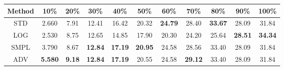 \documentclass{standalone}
\begin{document}
\begin{tabular}{c|cccccccccc}
      \toprule
      Method & 10\% & 20\% & 30\% & 40\% & 50\% & 60\% & 70\% & 80\% & 90\% & 100\% \\
      \midrule
STD & 2.660 & 7.91 & 12.41 & 16.42 & 20.32 & \textbf{24.79} & 28.40 & \textbf{33.67} & 28.09 & 31.84\\
LOG & 2.530 & 8.75 & 12.65 & 14.85 & 17.90 & 20.30 & 24.20 & 25.64 & \textbf{28.51} & \textbf{34.34}\\
SMPL & 3.790 & 8.67 & \textbf{12.84} & \textbf{17.19} & \textbf{20.95} & 24.58 & 28.56 & 33.40 & 28.09 & 31.84\\
ADV & \textbf{5.580} & \textbf{9.18} & \textbf{12.84} & \textbf{17.19} & 20.55 & 24.58 & \textbf{29.12} & 33.40 & 28.09 & 31.84\\
  \bottomrule
\end{tabular}
\end{document}
